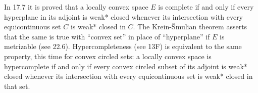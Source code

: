 In 17.7 it is proved that a locally convex space $E$ is complete if and only if every hyperplane in its adjoint is weak* closed whenever its intersection with every equicontinuous set $C$ is weak* closed in $C$. The Krein-\v{S}mulian theorem asserts that the same is true with ``convex set'' in place of ``hyperplane'' if $E$ is metrizable (see 22.6). Hypercompleteness (see 13F) is equivalent to the same property, this time for convex circled sets: a locally convex space is hypercomplete if and only if every convex circled subset of its adjoint is weak* closed whenever its intersection with every equicontinuous set is weak* closed in that set.
